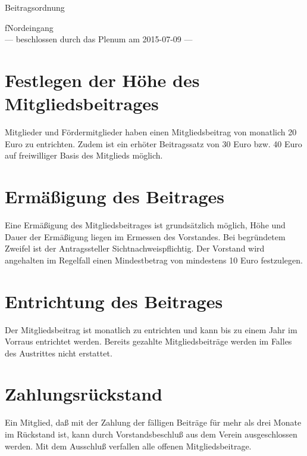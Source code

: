 \documentclass[ngerman]{scrartcl}
\begin{document}
\renewcommand*{\othersectionlevelsformat}[3]{\S#3\autodot\enskip}
\begin{titlepage}
\centerline{\Large Beitragsordnung}
\begin{center}
{\Huge fNordeingang}\\[5mm]
\vfill
--- beschlossen durch das Plenum am 2015-07-09 ---
\end{center}
\end{titlepage}
\section{Festlegen der Höhe des Mitgliedsbeitrages}
Mitglieder und Fördermitglieder haben einen Mitgliedsbeitrag von monatlich
20 Euro zu entrichten. Zudem ist ein erhöter Beitragssatz von 30 Euro bzw. 40 Euro auf freiwilliger Basis des Mitglieds möglich.
\section{Ermäßigung des Beitrages}
Eine Ermäßigung des Mitgliedsbeitrages ist grundsätzlich möglich, Höhe und
Dauer der Ermäßigung liegen im Ermessen des Vorstandes. Bei begründetem
Zweifel ist der Antragssteller Sichtnachweispflichtig. Der Vorstand wird angehalten im Regelfall einen Mindestbetrag von mindestens 10 Euro festzulegen.
\section{Entrichtung des Beitrages}
Der Mitgliedsbeitrag ist monatlich zu entrichten und kann bis zu einem Jahr im
Vorraus entrichtet werden. Bereits gezahlte Mitgliedsbeiträge werden im Falles
des Austrittes nicht erstattet.
\section{Zahlungsrückstand}
Ein Mitglied, daß mit der Zahlung der fälligen Beiträge für mehr als drei
Monate im Rückstand ist, kann durch Vorstandsbeschluß aus dem Verein
ausgeschlossen werden. Mit dem Ausschluß verfallen alle offenen Mitgliedsbeitrage.
\end{document}
